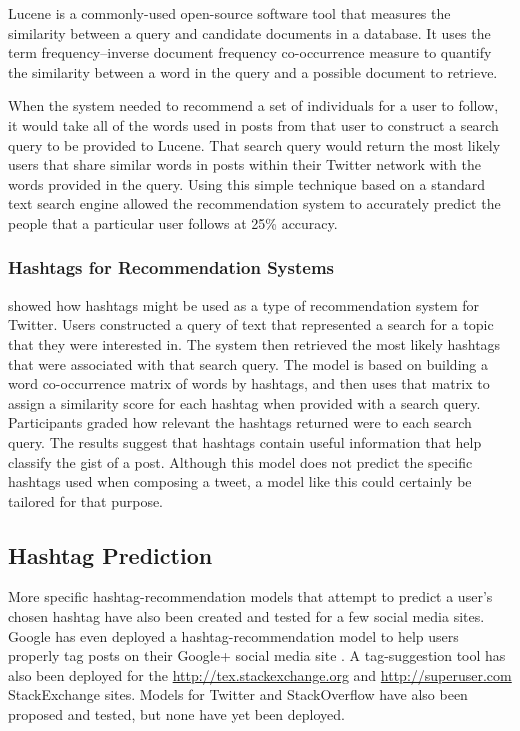 \documentclass[man,floatsintext,donotrepeattitle]{apa6}
\begin{document}
Lucene \parencite{McCandless2010} is a commonly-used open-source software tool that measures the similarity between a query and candidate documents in a database.
It uses the term frequency--inverse document frequency co-occurrence measure to quantify the similarity between a word in the query and a possible document to retrieve.

When the system needed to recommend a set of individuals for a user to follow, it would take all of the words used in posts from that user to construct a search query to be provided to Lucene.
That search query would return the most likely users that share similar words in posts within their Twitter network with the words provided in the query.
Using this simple technique based on a standard text search engine allowed the recommendation system to accurately predict the people that a particular user follows at 25\% accuracy.

\subsubsection{Hashtags for Recommendation Systems}

\textcite{Efron2010} showed how hashtags might be used as a type of recommendation system for Twitter.
Users constructed a query of text that represented a search for a topic that they were interested in.
The system then retrieved the most likely hashtags that were associated with that search query.
The model is based on building a word co-occurrence matrix of words by hashtags, and then uses that matrix to assign a similarity score for each hashtag when provided with a search query.
Participants graded how relevant the hashtags returned were to each search query.
The results suggest that hashtags contain useful information that help classify the gist of a post. 
Although this model does not predict the specific hashtags used when composing a tweet, a model like this could certainly be tailored for that purpose.

\subsection{Hashtag Prediction}

More specific hashtag-recommendation models that attempt to predict a user's chosen hashtag have also been created and tested for a few social media sites.
Google has even deployed a hashtag-recommendation model to help users properly tag posts on their Google+ social media site \parencite{GoogleKeynote2013}.
A tag-suggestion tool has also been deployed for the \url{http://tex.stackexchange.org} and \url{http://superuser.com} StackExchange sites.
Models for Twitter and StackOverflow have also been proposed and tested, but none have yet been deployed.
\end{document}
